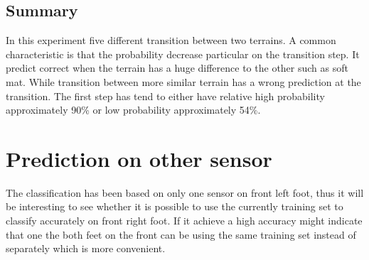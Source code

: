 \documentclass[USenglish]{ifimaster}  %
\begin{document}
	\begin{table}[h]
		\centering
		\caption{The table showing probability of each terrain per step walking from soft mat to carpet. Marked green represent correct prediction and correct terrain, red represent wrong prediction and yellow is the correct prediction if it got wrong.}
		\label{tab:softcarpet}
	\end{table}
	\FloatBarrier
\subsection{Summary}
In this experiment five different transition between two terrains. A common characteristic is that the probability decrease particular on the transition step. It predict correct when the terrain has a huge difference to the other such as soft mat. While transition between more similar terrain has a wrong prediction at the transition. The first step has tend to either have relative high probability approximately 90\% or low probability approximately 54\%.
	
	
\section{Prediction on other sensor}
The classification has been based on only one sensor on front left foot, thus it will be interesting to see whether it is possible to use the currently training set to classify accurately on front right foot. If it achieve a high accuracy might indicate that one the both feet on the front can be using the same training set instead of separately which is more convenient.
	
\end{document}
